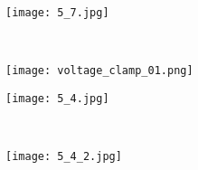 \documentclass[main]{subfiles}
\begin{document}
\begin{figure}[H]
	\centering
	\begin{subfigure}[b]{0.5\textwidth}
    	\centering
		\texttt{[image: 5\_7.jpg]}
	\end{subfigure}%
	~
	\begin{subfigure}[b]{0.5\textwidth}
		\centering
		\texttt{[image: voltage\_clamp\_01.png]}
	\end{subfigure}
\end{figure}

\begin{figure}[H]
	\centering
	\begin{subfigure}[b]{0.65\textwidth}
    	\centering
		\texttt{[image: 5\_4.jpg]}
	\end{subfigure}%
	~
	\begin{subfigure}[b]{0.35\textwidth}
		\centering
		\texttt{[image: 5\_4\_2.jpg]}
	\end{subfigure}
\end{figure}
\end{document}

